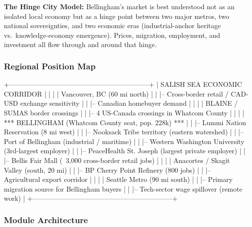 \documentclass[11pt,letterpaper]{article}
\begin{document}
\textbf{The Hinge City Model:} Bellingham's market is best understood not as an isolated local economy but as a hinge point between two major metros, two national sovereignties, and two economic eras (industrial-anchor heritage vs.\ knowledge-economy emergence). Prices, migration, employment, and investment all flow through and around that hinge.

\subsubsection{Regional Position Map}

\begin{asciibox}
+--------------------------------------------------------------+
|  SALISH SEA ECONOMIC CORRIDOR                                |
|                                                              |
|  Vancouver, BC (60 mi north)                                 |
|    |-- Cross-border retail / CAD-USD exchange sensitivity    |
|    |-- Canadian homebuyer demand                             |
|                                                              |
|  BLAINE / SUMAS border crossings                             |
|    |-- 4 US-Canada crossings in Whatcom County               |
|                                                              |
|  *** BELLINGHAM (Whatcom County seat, pop. 228k) ***         |
|    |-- Lummi Nation Reservation (8 mi west)                  |
|    |-- Nooksack Tribe territory (eastern watershed)          |
|    |-- Port of Bellingham (industrial / maritime)            |
|    |-- Western Washington University (3rd-largest employer)  |
|    |-- PeaceHealth St. Joseph (largest private employer)     |
|    |-- Bellis Fair Mall (~3,000 cross-border retail jobs)    |
|                                                              |
|  Anacortes / Skagit Valley (south, 20 mi)                    |
|    |-- BP Cherry Point Refinery (800 jobs)                   |
|    |-- Agricultural export corridor                          |
|                                                              |
|  Seattle Metro (90 mi south)                                 |
|    |-- Primary migration source for Bellingham buyers        |
|    |-- Tech-sector wage spillover (remote work)              |
+--------------------------------------------------------------+
\end{asciibox}

\subsubsection{Module Architecture}
\end{document}

